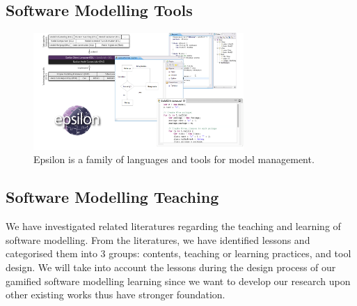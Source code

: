 \documentclass[12pt, a4paper]{report}
\begin{document}
\subsection{Software Modelling Tools}

\begin{figure}[ht]
\centering
\includegraphics[width=8cm]{epsilon}
\caption{Epsilon is a family of languages and tools for model management\cite{kolovos2015eugenia}.}
\label{fig:epsilon}
\end{figure}

\subsection{Software Modelling Teaching}
\label{Software Modelling Teaching}
We have investigated related literatures regarding the teaching and learning of software modelling.  From the literatures, we have identified lessons and categorised them into 3 groups: contents, teaching or learning practices, and tool design. We will take into account the lessons during the design process of our gamified software modelling learning since we want to develop our research upon other existing works thus have stronger foundation.   
\end{document}

